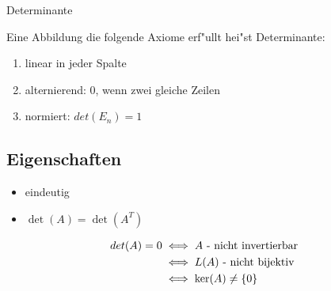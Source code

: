 \documentclass[class=article, crop=false]{standalone}
\begin{document}
\begin{zettel}{Determinante}
\begin{flashcard}
\begin{definition}{}
Eine Abbildung die folgende Axiome erf"ullt hei"st Determinante:
\begin{enumerate}
    \item linear in jeder Spalte
    \item alternierend: 0, wenn zwei gleiche Zeilen
    \item normiert: $det(E_{n}) = 1$
\end{enumerate}
\end{definition}
\end{flashcard}

\subsection*{Eigenschaften}
\begin{itemize}
    \item eindeutig
    \item $\det(A) = \det(A^T)$ 
\end{itemize}
\begin{align*}
    det(A) =  0 &\iff A \text{ - nicht invertierbar }\\
                & \iff L(A) \text{ - nicht bijektiv }\\
                & \iff \ker(A) \neq \set{0}\\
\end{align*}

\end{zettel}
\end{document}
